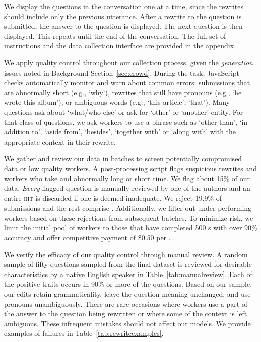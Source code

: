 We display the questions in the conversation one at a time, since the
rewrites should include only the previous utterance.  After a rewrite
to the question is submitted, the answer to the question is displayed.
The next question is then displayed.  This repeats until the end of
the conversation. The full set of instructions and the data collection
interface are provided in the appendix.

We apply quality control throughout our collection process, given the \textit{generation} issues noted in Background Section~\ref{sec:crowd}. 
%
During the task, JavaScript checks automatically monitor and warn
about common errors: submissions that are abnormally short
(e.g., `why'), rewrites that still have pronouns (e.g., `he wrote this album'),
or ambiguous words (e.g., `this article', `that').
%
Many \abr{\quac} questions ask about `what/who else' or ask for
`other' or `another' entity. For that class of questions, we ask
workers to use a phrase such as `other than', `in addition to', `aside
from', `besides', `together with' or `along with' with the appropriate
context in their rewrite.

We gather and review our data in batches to
screen potentially compromised data or low quality workers.
%
A post-processing script flags suspicious rewrites and workers who take and abnormally long or short time.
%
We flag about 15\% of our data.
%
\textit{Every} flagged question is manually reviewed by one of the
authors and an entire \textsc{hit} is discarded if one is deemed
inadequate.
%
We reject 19.9\% of submissions and the rest comprise \name{}.
%
Additionally, we filter out under-performing workers based on these
rejections from subsequent batches.
%
To minimize risk, we limit the initial pool of workers to those that
have completed 500 s with over 90\% accuracy and offer competitive payment of \$0.50 per .
% 

We verify the efficacy of our quality control through manual review.
A random sample of fifty questions sampled from the final dataset is reviewed for desirable characteristics by a native English speaker in Table~\ref{tab:manualreview}.  Each of the positive traits occurs in 90\% or more of the questions.  Based on our sample, our edits retain grammaticality, leave the
question meaning unchanged, and use pronouns unambiguously.  There are rare occasions where workers use a part of the answer to the question being rewritten or where some of the context is left ambiguous.  These infrequent mistakes should not affect our models.
We provide examples of failures in Table~\ref{tab:rewriteexamples}.


